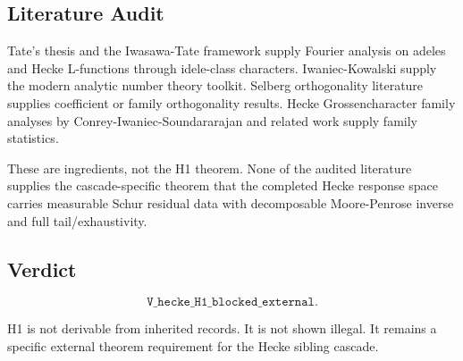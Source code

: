 \subsection*{Literature Audit}

Tate's thesis and the Iwasawa-Tate framework supply Fourier analysis on adeles and Hecke L-functions through idele-class characters. Iwaniec-Kowalski supply the modern analytic number theory toolkit. Selberg orthogonality literature supplies coefficient or family orthogonality results. Hecke Grossencharacter family analyses by Conrey-Iwaniec-Soundararajan and related work supply family statistics.

These are ingredients, not the H1 theorem. None of the audited literature supplies the cascade-specific theorem that the completed Hecke response space carries measurable Schur residual data with decomposable Moore-Penrose inverse and full tail/exhaustivity.

\subsection*{Verdict}

\[
\texttt{V\_hecke\_H1\_blocked\_external}.
\]

H1 is not derivable from inherited records. It is not shown illegal. It remains a specific external theorem requirement for the Hecke sibling cascade.
